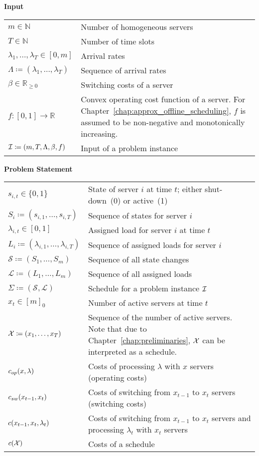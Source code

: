
\large{\textbf{Input}}
\bgroup
\def\arraystretch{1.5}%
\begin{longtable}{p{} p{}}
  $m\in\mathbb{N}$ & Number of homogeneous servers \\
  $T\in\mathbb{N}$& Number of time slots\\
  $\lambda_1,\dotsc,\lambda_{T}\in[0,m]$& Arrival rates\\
  $\Lambda\coloneqq(\lambda_1,\dotsc,\lambda_T)$& Sequence of arrival rates\\
  $\beta\in\mathbb{R}_{\ge 0}$& Switching costs of a server\\
  $f:[0,1]\rightarrow\mathbb{R}$& Convex operating cost function of a server. For Chapter~\ref{chap:approx_offline_scheduling}, $f$ is assumed to be non-negative and monotonically increasing.\\
  $\mathcal{I}\coloneqq(m,T,\Lambda,\beta,f)$& Input of a problem instance
\end{longtable}
\large{\textbf{Problem Statement}}
\begin{longtable}{p{} p{}}
  $s_{i,t}\in\{0,1\}$& State of server $i$ at time $t$; either shut-down~(0) or active~(1)\\
  $S_i\coloneqq(s_{i,1},\dotsc,s_{i,T})$& Sequence of states for server $i$\\
  $\lambda_{i,t}\in[0,1]$& Assigned load for server $i$ at time $t$\\
  $L_i\coloneqq(\lambda_{i,1},\dotsc,\lambda_{i,T})$& Sequence of assigned loads for server $i$\\
  $\mathcal{S}\coloneqq(S_1,\dotsc,S_m)$& Sequence of all state changes\\
  $\mathcal{L}\coloneqq(L_1,\dotsc,L_m)$& Sequence of all assigned loads\\
  $\Sigma\coloneqq(\mathcal{S},\mathcal{L})$& Schedule for a problem instance $\mathcal{I}$\\
  $x_t\in[m]_0$& Number of active servers at time $t$\\
  $\mathcal{X}\coloneqq(x_1,\ldots,x_T)$& Sequence of the number of active servers. Note that due to Chapter~\ref{chap:preliminaries}, $\mathcal{X}$ can be interpreted as a schedule.\\
  $c_{op}(x,\lambda)$& Costs of processing $\lambda$ with $x$ servers (operating costs)\\
  $c_{sw}(x_{t-1},x_{t})$& Costs of switching from $x_{t-1}$ to $x_t$ servers (switching costs)\\
  $c(x_{t-1},x_{t},\lambda_t)$& Costs of switching from $x_{t-1}$ to $x_t$ servers and processing $\lambda_t$ with $x_t$ servers\\
  $c(\mathcal{X})$& Costs of a schedule
\end{longtable}
